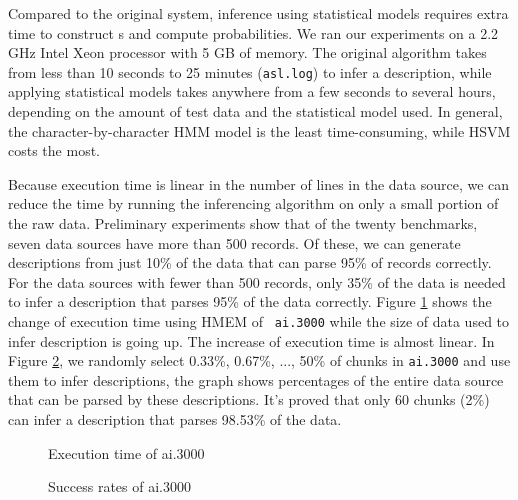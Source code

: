 Compared to the original \learnpads{} system, inference using
statistical models requires extra time to construct \seqset{}s and
compute probabilities. 
We ran our experiments on a 2.2 GHz Intel Xeon processor with 5
GB of memory. The original \learnpads{} algorithm takes from less than
10 seconds to 25 minutes ({\tt asl.log}) to infer a description, while applying statistical models
takes anywhere from a few seconds to several hours, depending on the amount of test data
and the statistical model used. In general, the character-by-character
HMM model is the least time-consuming, while HSVM costs the most.

Because execution time is linear in the
number of lines in the data source, we can reduce the time by
running the inferencing algorithm on only a small portion of the raw
data.
Preliminary experiments show that of the twenty benchmarks, seven data sources
have more than 500 records.  Of these, we can generate
descriptions from just 10\% of the data that can
parse 95\% of records correctly.
For the data sources with fewer than 500 records,
only 35\% of the data is needed to infer a description that parses
95\% of the data correctly.
Figure \ref{fig:ai_1} shows the change of execution time using HMEM of {\tt
  ai.3000} while the size of data used to infer description is
going up. The increase of execution time is almost linear. In Figure
\ref{fig:ai_2}, we randomly select 0.33\%, 0.67\%, ..., 50\% of chunks in {\tt ai.3000}
and use them to infer descriptions, the graph shows percentages of the
entire data source that can be parsed by these descriptions. It's
proved that only 60 chunks (2\%) can infer a description that parses 98.53\%
of the data.

\begin{figure}[th]
\begin{center}
\end{center}
\caption{Execution time of ai.3000}\label{fig:ai_1}
\end{figure}

\begin{figure}[th]
\begin{center}
\end{center}
\caption{Success rates of ai.3000}\label{fig:ai_2}
\end{figure}
